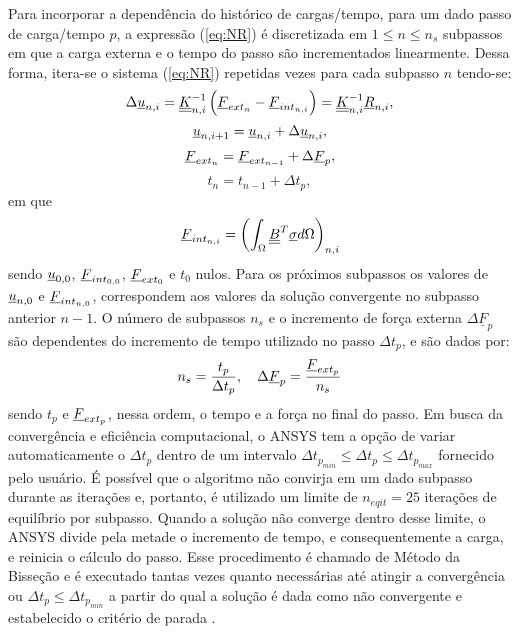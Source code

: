 Para incorporar a dependência do histórico de cargas/tempo, para um dado passo de carga/tempo $p$, a expressão (\ref{eq:NR}) é discretizada em $1 \leq n \leq n_s$ subpassos em que a carga externa e o tempo do passo são incrementados linearmente. Dessa forma, itera-se o sistema (\ref{eq:NR}) repetidas vezes para cada subpasso $n$ tendo-se:
\begin{equation}
	\label{eq:NR1}
	\Delta \underline u_{n,i} = \underline{\underline K}_{n,i}^{-1}\left(\underline{F}_{ext_{n}} - \underline{F}_{int_{n,i}} \right) = \underline{\underline K}_{n,i}^{-1}\underline{R}_{n,i},
\end{equation}
\begin{equation}
	\label{eq:NR2}
	\underline u_{n,i+1} = \underline u_{n,i}+\Delta\underline u_{n,i},
\end{equation}
\begin{equation}
	\label{eq:NR3}
	\underline{F}_{ext_{n}} = \underline{F}_{ext_{n-1}} + \Delta \underline{F}_{p},
\end{equation}
\begin{equation}
	\label{eq:NR4}
	t_{n} = t_{n-1} + \Delta t_p,
\end{equation}
em que
\begin{equation}
	\label{eq:NR5}
	\underline{F}_{int_{n,i}} = \left( \int_{\Omega} \underline{\underline B}^T \underline \sigma d\Omega \right)_{n,i}
\end{equation}
sendo $\underline u_{0,0}$, $\underline{F}_{int_{0,0}}$, $\underline{F}_{ext_0}$   e $t_0$ nulos. Para os próximos subpassos os valores de $\underline u_{n,0}$ e $\underline{F}_{int_{n,0}}$, correspondem aos valores da solução convergente no subpasso anterior $n-1$. O número de subpassos $n_s$ e o incremento de força externa $\Delta \underline{F}_p$ são dependentes do incremento de tempo utilizado no passo $\Delta t_p$, e são dados por:
\begin{equation}
	\label{eq:NR6}
	n_s = \dfrac{t_p}{\Delta t_p},~~~ \Delta \underline{F}_{p} = \dfrac{\underline{F}_{ext_p}}{n_s}
\end{equation}
sendo $t_p$ e $\underline{F}_{ext_p}$, nessa ordem, o tempo e a força no final do passo. Em busca da convergência e eficiência computacional, o ANSYS tem a opção de variar automaticamente o $\Delta t_p$ dentro de um intervalo $\Delta t_{p_{min}} \leq \Delta t_p \leq \Delta t_{p_{max}}$ fornecido pelo usuário. É possível que o algoritmo não convirja em um dado subpasso durante as iterações e, portanto, é utilizado um limite de $n_{eqit} = 25$ iterações de equilíbrio por subpasso. Quando a solução não converge dentro desse limite, o ANSYS divide pela metade o incremento de tempo, e consequentemente a carga, e reinicia o cálculo do passo. Esse procedimento é chamado de Método da Bisseção e é executado tantas vezes quanto necessárias até atingir a convergência ou $\Delta t_p \leq \Delta t_{p_{min}}$ a partir do qual a solução é dada como não convergente e estabelecido o critério de parada \cite[p. 637]{ANSYS2018}.

